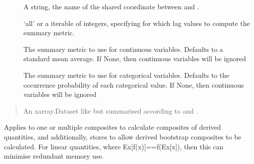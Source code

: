 \documentclass[letterpaper,10pt,english]{sphinxmanual}
\begin{document}
\begin{fulllineitems}
\begin{fulllineitems}
\sphinxAtStartPar
{}
\begin{description}
\item[{}] \leavevmode
\sphinxAtStartPar
A string, the name of the shared coordinate between  and .

\item[{}] \leavevmode
\sphinxAtStartPar
‘all’ or a iterable of integers, specifying for which lag values to compute the summary metric.

\item[{}] \leavevmode
\sphinxAtStartPar
The summary metric to use for continuous variables. Defaults to a standard mean average. If None, then continuous variables will be ignored

\item[{}] \leavevmode
\sphinxAtStartPar
The summary metric to use for categorical variables. Defaults to the occurrence probability of each categorical value. If None, then continuous variables will be ignored

\end{description}

\sphinxAtStartPar
{}
\begin{quote}

\sphinxAtStartPar
An xarray.Dataset like   but summarised according to  and .
\end{quote}

\end{fulllineitems}


\begin{fulllineitems}
\label{\detokenize{docs/composites:composites.LaggedAnalyser.add_derived_composite}}
\pysigstartsignatures
{}
\pysigstopsignatures
\sphinxAtStartPar
Applies  to one or multiple composites to calculate composites of derived quantities, and additionally, stores  to allow derived bootstrap composites to be calculated. For linear quantities, where Ex{[}f(x){]}==f(Ex{[}x{]}), then this can minimise redundant memory use.


\end{fulllineitems}
\end{fulllineitems}
\end{document}
